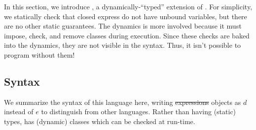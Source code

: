 \documentclass[11pt]{article}
\begin{document}
In this section, we introduce \LangPyCF{}, a dynamically-``typed'' extension of \LangPCF{}.
For simplicity, we statically check that closed express do not have unbound variables, but there are no other static guarantees.
The dynamics is more involved because it must impose, check, and remove classes during execution.
Since these checks are baked into the dynamics, they are not visible in the syntax. Thus, it isn't possible to program without them!

\subsection{Syntax}\label{sec:PyCF-grammar}

We summarize the syntax of this language here, writing \sout{expressions} objects as
$d$ instead of $e$ to distinguish from other languages.
Rather than having (static) types, \LangPyCF{} has (dynamic) classes which can be checked at run-time.
\end{document}
